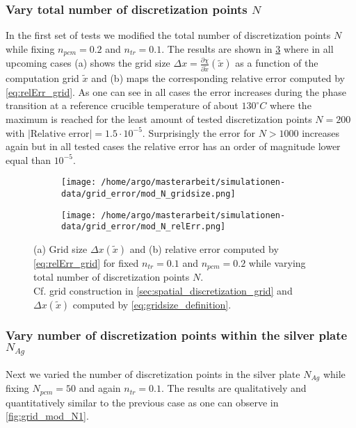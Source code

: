 \documentclass{scrartcl}[12pt, halfparskip]
\numberwithin{equation}{section}
\numberwithin{figure}{section}
\numberwithin{table}{section}
\begin{document}
\subsubsection{Vary total number of discretization points $N$}
In the first set of tests we modified the total number of discretization points $N$ while fixing $n_{pcm}=0.2$ and $n_{tr}=0.1$. The results are shown in \cref{fig:grid_mod_N} where in all upcoming cases (a) shows the grid size $\Delta x = \frac{\partial \chi}{\partial \tilde{x}}(\tilde{x})$ as a function of the computation grid $\tilde{x}$ and (b) maps the corresponding relative error computed by \cref{eq:relErr_grid}. As one can see in all cases the error increases during the phase transition at a reference crucible temperature of about $130^{\circ} C$ where the maximum is reached for the least amount of tested discretization points $N=200$ with $|\text{Relative error|}=1.5 \cdot 10^{-5}$. Surprisingly the error for $N > 1000$ increases again but in all tested cases the relative error has an order of magnitude lower equal than $10^{-5}$. 


\begin{figure}[H]
	\begin{subfigure}{0.49\textwidth}
		\texttt{[image: /home/argo/masterarbeit/simulationen-data/grid\_error/mod\_N\_gridsize.png]}
		\caption{}
		\label{fig:gridsize_mod_N}
	\end{subfigure}
	\begin{subfigure}{0.49\textwidth}
		\texttt{[image: /home/argo/masterarbeit/simulationen-data/grid\_error/mod\_N\_relErr.png]}
		\caption{}
		\label{fig:grid_relErr_mod_N}
	\end{subfigure}
	\caption{(a) Grid size $\Delta x(\tilde{x})$ and (b) relative error computed by \cref{eq:relErr_grid} for fixed $n_{tr}=0.1$ and $n_{pcm}=0.2$ while varying total number of discretization points $N$. \\
	Cf. grid construction in \cref{sec:spatial_discretization_grid} and $\Delta x(\tilde{x})$ computed by \cref{eq:gridsize_definition}.}
	\label{fig:grid_mod_N}
\end{figure}

\subsubsection{Vary number of discretization points within the silver plate $N_{Ag}$}
Next we varied the number of discretization points in the silver plate $N_{Ag}$ while fixing $N_{pcm}=50$ and again $n_{tr}=0.1$. The results are qualitatively and quantitatively similar to the previous case as one can observe in \cref{fig:grid_mod_N1}.
\end{document}
